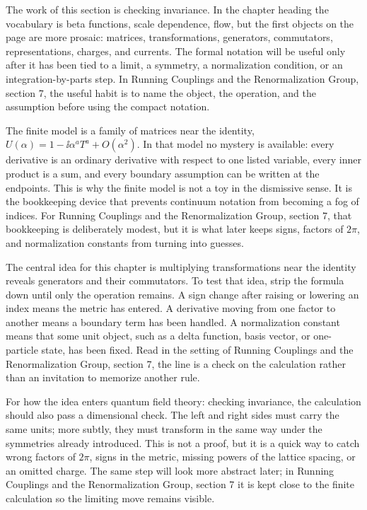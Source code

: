The work of this section is checking invariance.  In the chapter heading the vocabulary is beta functions, scale dependence, flow, but the first objects on the page are more prosaic: matrices, transformations, generators, commutators, representations, charges, and currents.  The formal notation will be useful only after it has been tied to a limit, a symmetry, a normalization condition, or an integration-by-parts step.  In Running Couplings and the Renormalization Group, section 7, the useful habit is to name the object, the operation, and the assumption before using the compact notation.

The finite model is a family of matrices near the identity, \(U(\alpha)=1-\ii\alpha^aT^a+O(\alpha^2)\).  In that model no mystery is available: every derivative is an ordinary derivative with respect to one listed variable, every inner product is a sum, and every boundary assumption can be written at the endpoints.  This is why the finite model is not a toy in the dismissive sense.  It is the bookkeeping device that prevents continuum notation from becoming a fog of indices.  For Running Couplings and the Renormalization Group, section 7, that bookkeeping is deliberately modest, but it is what later keeps signs, factors of \(2\pi\), and normalization constants from turning into guesses.

The central idea for this chapter is multiplying transformations near the identity reveals generators and their commutators.  To test that idea, strip the formula down until only the operation remains.  A sign change after raising or lowering an index means the metric has entered.  A derivative moving from one factor to another means a boundary term has been handled.  A normalization constant means that some unit object, such as a delta function, basis vector, or one-particle state, has been fixed.  Read in the setting of Running Couplings and the Renormalization Group, section 7, the line is a check on the calculation rather than an invitation to memorize another rule.

For how the idea enters quantum field theory: checking invariance, the calculation should also pass a dimensional check.  The left and right sides must carry the same units; more subtly, they must transform in the same way under the symmetries already introduced.  This is not a proof, but it is a quick way to catch wrong factors of \(2\pi\), signs in the metric, missing powers of the lattice spacing, or an omitted charge.  The same step will look more abstract later; in Running Couplings and the Renormalization Group, section 7 it is kept close to the finite calculation so the limiting move remains visible.


